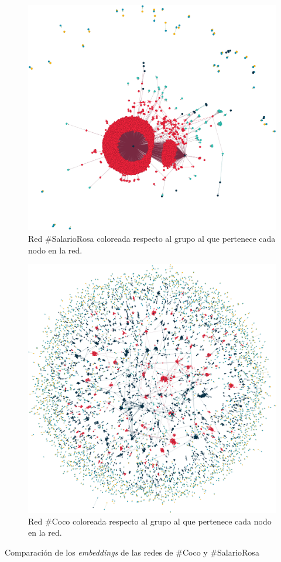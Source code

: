 \begin{figure}
    \centering
    \includegraphics[width=.75\textwidth]{images/SalarioRosa.png}
    \caption{Red \#SalarioRosa coloreada respecto al grupo al que pertenece cada nodo en la red.}
    \label{fig:net-salario}
\end{figure}

\begin{figure}
    \centering
    \includegraphics[width=.75\textwidth]{images/Coco.png}
    \caption{Red \#Coco coloreada respecto al grupo al que pertenece cada nodo en la red.}
    \label{fig:net-coco}
\end{figure}


\begin{table}[h]
\centering
        \newline
        \caption{Comparación de los \textit{embeddings} de las redes de \#Coco y \#SalarioRosa}
        \label{table:comparacionCocoSalarioRosa}
\end{table}


